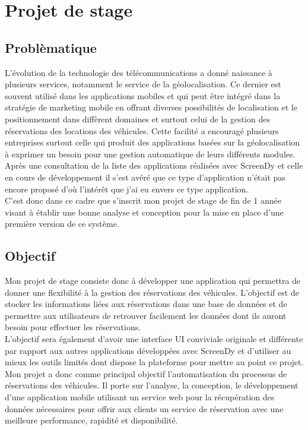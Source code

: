 \documentclass[12pt,a4paper]{report}
\begin{document}
	

		\chapter{Projet de stage}
		
		\section{Problèmatique}
L’évolution de la technologie des télécommunications a donné naissance à plusieurs services,
notamment le service de la géolocalisation. Ce dernier est souvent utilisé dans les applications
mobiles et qui peut être intégré dans la stratégie de marketing mobile en offrant diverses possibilités
de localisation et le positionnement dans diffèrent domaines et surtout celui de la gestion des
réservations des locations des véhicules. Cette facilité a encouragé plusieurs entreprises surtout celle
qui produit des applications basées sur la géolocalisation à exprimer un besoin pour une gestion
automatique de leurs différents modules.\\
Après une consultation de la liste des applications réalisées avec ScreenDy et celle en cours de développement il s'est avéré que ce type d'application n'était pas encore proposé d'où l'intérêt que j'ai eu envers ce type application.\\
C’est donc dans ce cadre que s’inscrit mon projet de stage de fin de 1 ann\'ee visant à établir
une bonne analyse et conception pour la mise en place d’une première version de ce système.

		
		\section{Objectif}
Mon projet de stage consiste donc à développer une application qui permettra de donner
une flexibilité à la gestion des réservations des véhicules. L’objectif est de stocker les informations
liées aux réservations dans une base de données et de permettre aux utilisateurs de retrouver facilement les données dont ils auront besoin pour effectuer les réservations.\\
L’objectif sera également d’avoir une interface UI conviviale originale et différente par rapport aux autres applications développées avec ScreenDy et d’utiliser au mieux les outils limités dont dispose la plateforme pour mettre au point ce projet.\\
Mon projet a donc comme principal objectif l’automatisation du processus de réservations des
véhicules. Il porte sur l’analyse, la conception, le développement d’une application mobile utilisant
un service web pour la récupération des données nécessaires pour offrir aux clients un service de
réservation avec une meilleure performance, rapidité et disponibilité.\\
\end{document}
